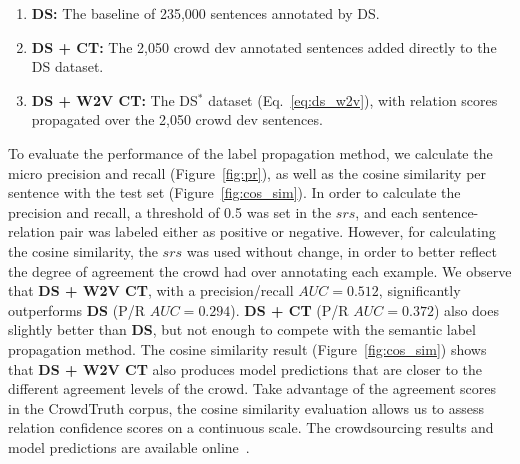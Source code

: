 \begin{enumerate}
\item \textbf{DS:} The baseline of 235,000 sentences annotated by DS.
\item \textbf{DS + CT:} The 2,050 crowd dev annotated sentences added directly to the DS dataset.
\item \textbf{DS + W2V CT:} The DS$^{*}$ dataset (Eq.~\ref{eq:ds_w2v}), with relation scores propagated over the 2,050 crowd dev sentences.
\end{enumerate}

To evaluate the performance of the label propagation method, we calculate the micro precision and recall (Figure~\ref{fig:pr}), as well as the cosine similarity per sentence with the test set (Figure~\ref{fig:cos_sim}).  In order to calculate the precision and recall, a threshold of 0.5 was set in the $srs$, and each sentence-relation pair was labeled either as positive or negative. However, for calculating the cosine similarity, the $srs$ was used without change, in order to better reflect the degree of agreement the crowd had over annotating each example.  We observe that \textbf{DS + W2V CT}, with a precision/recall $AUC = 0.512$, significantly outperforms \textbf{DS} (P/R $AUC = 0.294$). \textbf{DS + CT} (P/R $AUC = 0.372$) also does slightly better than \textbf{DS}, but not enough to compete with the semantic label propagation method. The cosine similarity result (Figure~\ref{fig:cos_sim}) shows that \textbf{DS + W2V CT} also produces model predictions that are closer to the different agreement levels of the crowd. Take advantage of the agreement scores in the CrowdTruth corpus, the cosine similarity evaluation allows us to assess relation confidence scores on a continuous scale. The crowdsourcing results and model predictions are available online~\cite{crowdODrelexdata2016}.

